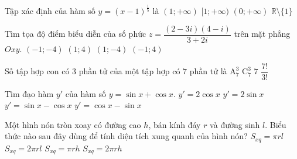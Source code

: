 \begin{ex}%
	Tập xác định của hàm số $y=(x-1)^{\tfrac{1}{5}}$ là
	\choice
	{\True $(1;+ \infty)$}
	{$[1;+ \infty)$}
	{$(0;+ \infty)$}
	{$\mathbb{R} \setminus \{1 \}$}
\end{ex}
\begin{ex}%
	Tìm tọa độ điểm biểu diễn của số phức $z= \dfrac{(2-3i)(4-i)}{3+2i}$ trên mặt phẳng $Oxy$.
	\choice
	{\True $(-1;-4)$}
	{$(1;4)$}
	{$(1;-4)$}
	{$(-1;4)$}
\end{ex}
\begin{ex}%
	Số tập hợp con có $3$ phần tử của một tập hợp có $7$ phần tử là
	\choice
	{$\mathrm{A}_7^3$}
	{\True $\mathrm{C}_7^3$}
	{$7$}
	{$\dfrac{7!}{3!}$}
\end{ex}
\begin{ex}%
	Tìm đạo hàm $y'$ của hàm số $y= \sin x+ \cos x$.
	\choice
	{$y'=2 \cos x$}
	{$y'=2 \sin x$}
	{$y'= \sin x- \cos x$}
	{\True $y'= \cos x- \sin x$}
\end{ex}
\begin{ex}%
	Một hình nón tròn xoay có đường cao $h$, bán kính đáy $r$ và đường sinh $l$. Biểu thức nào sau đây dùng để tính diện tích xung quanh của hình nón?
	\choice
	{\True $S_{xq}= \pi rl$}
	{$S_{xq}=2 \pi rl$}
	{$S_{xq}= \pi rh$}
	{$S_{xq}=2 \pi rh$}
\end{ex}
